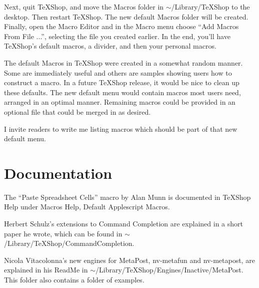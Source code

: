 \documentclass[11pt, oneside]{amsart}
\begin{document}
Next, quit TeXShop, and move the Macros folder in $\sim$/Library/TeXShop to the desktop. Then restart TeXShop. The new default Macros folder will be created. Finally, open the Macro Editor and in the Macro menu choose ``Add Macros From File ...'', selecting the file you created earlier. In the end, you'll have TeXShop's default macros, a divider, and then your personal macros.

The default Macros in TeXShop were created in a somewhat random manner. Some are immediately useful and others are samples showing users how to construct a macro. In a future TeXShop release, it would be nice to clean up these defaults. The new default menu would contain macros most users need, arranged in an optimal manner. Remaining macros could be provided in an optional file that could be merged in as desired.

I invite readers to write me listing macros which should be part of that new default menu. 

\section{Documentation}

The ``Paste Spreadsheet Cells'' macro by Alan Munn is documented in TeXShop Help under Macros Help, Default Applescript Macros.

Herbert Schulz's extensions to Command Completion are explained in a short paper he wrote, which can be found in $\sim$/Library/TeXShop/CommandCompletion.

Nicola Vitacolonna's new engines for MetaPost, nv-metafun and nv-metapost, are explained in his ReadMe in
$\sim$/Library/TeXShop/Engines/Inactive/MetaPost. This folder also contains a folder of examples.



\end{document}
